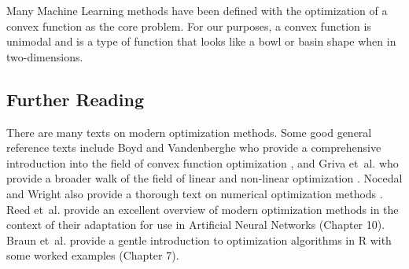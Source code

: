 \begin{bibunit}
Many Machine Learning methods have been defined with the optimization of a convex function as the core problem. For our purposes, a convex function is unimodal and is a type of function that looks like a bowl or basin shape when in two-dimensions.

\subsection{Further Reading}
There are many texts on modern optimization methods. Some good general reference texts include Boyd and Vandenberghe  who provide a comprehensive introduction into the field of convex function optimization \cite{Boyd2004}, and Griva et~al. who provide a broader walk of the field of linear and non-linear optimization \cite{Griva2009}. Nocedal and Wright also provide a thorough text on numerical optimization methods \cite{Nocedal1999}.
Reed et~al. provide an excellent overview of modern optimization methods in the context of their adaptation for use in Artificial Neural Networks \cite{Reed1998} (Chapter 10).
Braun et~al. provide a gentle introduction to optimization algorithms in R with some worked examples \cite{Braun2007} (Chapter 7).

\putbib
\end{bibunit}

\newpage\begin{bibunit}\putbib\end{bibunit}
\newpage\begin{bibunit}\putbib\end{bibunit}
\newpage\begin{bibunit}\putbib\end{bibunit}
\newpage\begin{bibunit}\putbib\end{bibunit}
\newpage\begin{bibunit}\putbib\end{bibunit}
